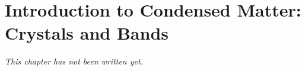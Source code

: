 \chapter{Introduction to Condensed Matter: Crystals and Bands}\label{ch:b3:condensed-matter}


\emph{This chapter has not been written yet.}
